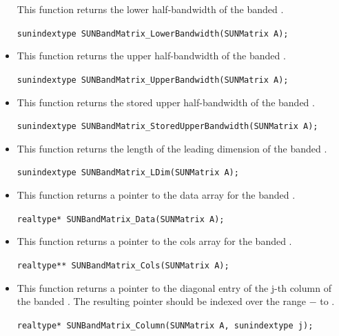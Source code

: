 \begin{itemize}
  This function returns the lower half-bandwidth of the banded .
 
  \verb|sunindextype SUNBandMatrix_LowerBandwidth(SUNMatrix A);|


\item {}

  This function returns the upper half-bandwidth of the banded .
 
  \verb|sunindextype SUNBandMatrix_UpperBandwidth(SUNMatrix A);|


\item {}

  This function returns the stored upper half-bandwidth of the banded .
 
  \verb|sunindextype SUNBandMatrix_StoredUpperBandwidth(SUNMatrix A);|


\item {}

  This function returns the length of the leading dimension of the banded .
 
  \verb|sunindextype SUNBandMatrix_LDim(SUNMatrix A);|


\item {}

  This function returns a pointer to the data array for the banded .
 
  \verb|realtype* SUNBandMatrix_Data(SUNMatrix A);|


\item {}

  This function returns a pointer to the cols array for the banded .
 
  \verb|realtype** SUNBandMatrix_Cols(SUNMatrix A);|


\item {}

  This function returns a pointer to the diagonal entry of the j-th
  column of the banded .  The resulting pointer should
  be indexed over the range $-$ to . 
 
  \verb|realtype* SUNBandMatrix_Column(SUNMatrix A, sunindextype j);|

\end{itemize}
